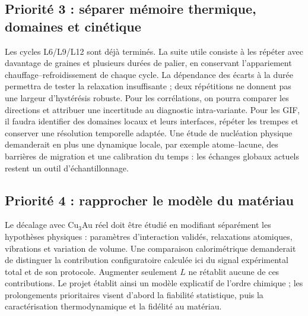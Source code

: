 \documentclass[10pt,a4paper]{article}
\begin{document}
\subsection*{Priorité 3 : séparer mémoire thermique, domaines et cinétique}
Les cycles L6/L9/L12 sont déjà terminés. La suite utile consiste à
les répéter avec davantage de graines et plusieurs durées de palier,
en conservant l'appariement chauffage--refroidissement de chaque cycle.
La dépendance des écarts à la durée permettra de tester la relaxation
insuffisante ; deux répétitions ne donnent pas une largeur d'hystérésis
robuste. Pour les corrélations, on pourra comparer les directions et
attribuer une incertitude au diagnostic intra-variante. Pour les GIF,
il faudra identifier des domaines locaux et leurs interfaces, répéter
les trempes et conserver une résolution temporelle adaptée. Une étude
de nucléation physique demanderait en plus une dynamique locale,
par exemple atome--lacune, des barrières de migration et une calibration
du temps : les échanges globaux actuels restent un outil d'échantillonnage.

\subsection*{Priorité 4 : rapprocher le modèle du matériau}
Le décalage avec Cu$_3$Au réel doit être étudié en modifiant séparément
les hypothèses physiques : paramètres d'interaction validés,
relaxations atomiques, vibrations et variation de volume.
Une comparaison calorimétrique demanderait de distinguer la contribution
configuratoire calculée ici du signal expérimental total et de son
protocole. Augmenter seulement $L$ ne rétablit aucune de ces contributions.
Le projet établit ainsi un modèle explicatif de l'ordre chimique ; les
prolongements prioritaires visent d'abord la fiabilité statistique,
puis la caractérisation thermodynamique et la fidélité au matériau.

\appendix
\end{document}
